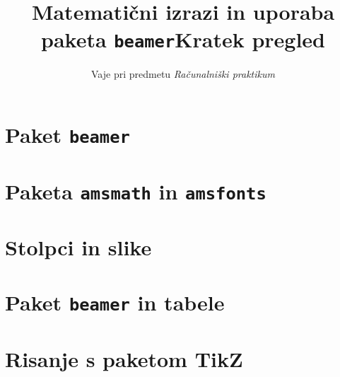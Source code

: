 \documentclass{beamer}
\theoremstyle{plain}
\begin{document}
\title{Matematični izrazi in uporaba paketa \texttt{beamer}}
\subtitle{Vaje pri predmetu \emph{Računalniški praktikum}}
\date{}

\begin{frame}
    \titlepage
\end{frame}
\begin{frame}
    \title{Kratek pregled}
    \tableofcontents%
\end{frame}
\section{Paket \texttt{beamer}}
    

\section{Paketa \texttt{amsmath} in \texttt{amsfonts}}
    
\section{Stolpci in slike}
    
\section{Paket \texttt{beamer} in tabele}
    
\section{Risanje s paketom TikZ}
    
\end{document}
